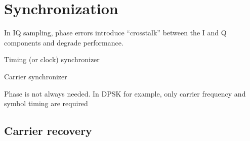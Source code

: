%
%
%


\section{Synchronization}

In IQ sampling, phase errors introduce ``crosstalk'' between the I and Q components and degrade performance.

Timing (or clock) synchronizer

Carrier synchronizer

Phase is not always needed. In DPSK for example, only carrier frequency and symbol timing are required


\subsection{Carrier recovery}

